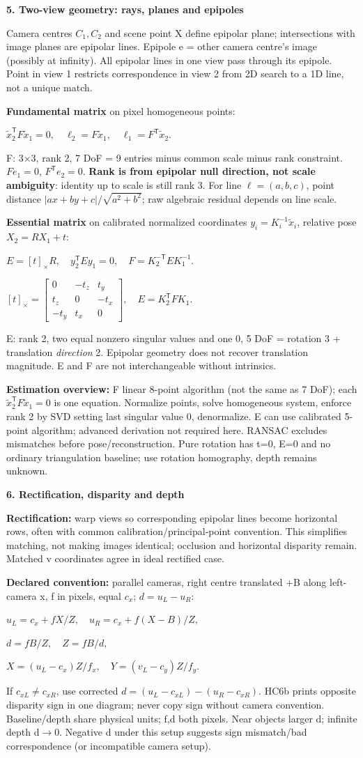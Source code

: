 \documentclass[a4paper]{article}
\newcommand{\key}[1]{\textbf{#1}}
\newcommand{\Topic}[1]{\par\vspace{1.7pt}\noindent
  {\fontsize{7.7}{8.0}\selectfont\bfseries #1}\par\vspace{0.3pt}}
\newcommand{\eq}[1]{\par\noindent\mbox{\(\displaystyle #1\)}\par}
\newcommand{\smat}[1]{\left[\begin{smallmatrix}#1\end{smallmatrix}\right]}
\newcommand{\trans}{^{\mathsf T}}
\newcommand{\inv}{^{-1}}
\newcounter{sheet}
\newcounter{sheetcolumn}
\newlength{\colwidth}
\newenvironment{sheetcol}[1][7.0]{\stepcounter{sheetcolumn}
  \begin{lrbox}{\columnbox}\begin{minipage}[t]{\colwidth}\vspace{0pt}
  \fontsize{#1}{\dimexpr#1pt+0.6pt\relax}\selectfont}
  {\end{minipage}\end{lrbox}
  \typeout{CV1COL|\thesheet|\thesheetcolumn|\the\dimexpr\ht\columnbox+\dp\columnbox\relax}
  \usebox{\columnbox}\ignorespacesafterend}
\begin{document}
\begin{sheetcol}
\Topic{5. Two-view geometry: rays, planes and epipoles}
Camera centres \(C_1,C_2\) and scene point X define epipolar plane; intersections with image planes are epipolar lines. Epipole e = other camera centre's image (possibly at infinity). All epipolar lines in one view pass through its epipole. Point in view 1 restricts correspondence in view 2 from 2D search to a 1D line, not a unique match.

\key{Fundamental matrix} on pixel homogeneous points:
\eq{\tilde x_2\trans F\tilde x_1=0,\quad
 \ell_2=F\tilde x_1,\quad\ell_1=F\trans\tilde x_2.}
F: 3\(\times\)3, rank 2, 7 DoF = 9 entries minus common scale minus rank constraint. \(Fe_1=0\), \(F\trans e_2=0\). \key{Rank is from epipolar null direction, not scale ambiguity}: identity up to scale is still rank 3. For line \(\ell=(a,b,c)\), point distance \(|ax+by+c|/\sqrt{a^2+b^2}\); raw algebraic residual depends on line scale.

\key{Essential matrix} on calibrated normalized coordinates \(y_i=K_i\inv\tilde x_i\), relative pose \(X_2=RX_1+t\):
\eq{E=[t]_\times R,\quad y_2\trans Ey_1=0,\quad
 F=K_2^{-\mathsf T}EK_1\inv.}
\eq{[t]_\times=\smat{0&-t_z&t_y\\t_z&0&-t_x\\-t_y&t_x&0},\quad
 E=K_2\trans FK_1.}
E: rank 2, two equal nonzero singular values and one 0, 5 DoF = rotation 3 + translation \emph{direction} 2. Epipolar geometry does not recover translation magnitude. E and F are not interchangeable without intrinsics.

\key{Estimation overview:} F linear 8-point algorithm (not the same as 7 DoF); each \(\tilde x_2\trans F\tilde x_1=0\) is one equation. Normalize points, solve homogeneous system, enforce rank 2 by SVD setting last singular value 0, denormalize. E can use calibrated 5-point algorithm; advanced derivation not required here. RANSAC excludes mismatches before pose/reconstruction. Pure rotation has t=0, E=0 and no ordinary triangulation baseline; use rotation homography, depth remains unknown.

\Topic{6. Rectification, disparity and depth}
\key{Rectification:} warp views so corresponding epipolar lines become horizontal rows, often with common calibration/principal-point convention. This simplifies matching, not making images identical; occlusion and horizontal disparity remain. Matched v coordinates agree in ideal rectified case.

\key{Declared convention:} parallel cameras, right centre translated +B along left-camera x, f in pixels, equal \(c_x\); \(d=u_L-u_R\):
\eq{u_L=c_x+fX/Z,\quad u_R=c_x+f(X-B)/Z,}
\eq{d=fB/Z,\quad Z=fB/d,}
\eq{X=(u_L-c_x)Z/f_x,\quad Y=(v_L-c_y)Z/f_y.}
If \(c_{xL}\ne c_{xR}\), use corrected \(d=(u_L-c_{xL})-(u_R-c_{xR})\). HC6b prints opposite disparity sign in one diagram; never copy sign without camera convention. Baseline/depth share physical units; f,d both pixels. Near objects larger d; infinite depth d\(\to0\). Negative d under this setup suggests sign mismatch/bad correspondence (or incompatible camera setup).


\end{sheetcol}
\end{document}

